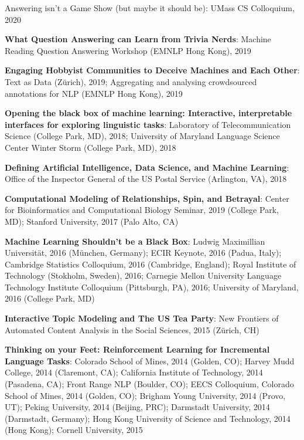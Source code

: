 {{\begin{enumerate*}
{      Answering isn't a Game Show (but maybe it should be)}: UMass CS
    Colloquium, 2020
\item {\bf What Question Answering can Learn from Trivia Nerds}:
  Machine Reading Question Answering Workshop (EMNLP Hong Kong), 2019
\item {\bf  Engaging Hobbyist
Communities to Deceive Machines and
Each Other}: Text as Data (Z\"urich), 2019; Aggregating and analysing
crowdsourced annotations for NLP (EMNLP Hong Kong), 2019
\item {\bf Opening the black box of machine learning: Interactive, interpretable interfaces for exploring linguistic tasks}: Laboratory of Telecommunication Science (College Park,
  MD), 2018;  University of Maryland Language Science Center Winter
  Storm (College Park, MD), 2018
\item {\bf Defining Artificial Intelligence, Data Science, and Machine
    Learning}: Office of the Inspector General of the US Postal
  Service (Arlington, VA), 2018
\item {\bf Computational Modeling of Relationships, Spin, and
    Betrayal}: Center for Bioinformatics and Computational Biology
  Seminar, 2019 (College Park, MD); Stanford University, 2017 (Palo
  Alto, CA)
\item {\bf Machine Learning Shouldn't be a Black Box}: Ludwig
  Maximillian Universit\"at, 2016 (M\"unchen, Germany); ECIR Keynote,
  2016 (Padua, Italy); Cambridge Statistics Colloquium, 2016
  (Cambridge, England); Royal Institute of Technology (Stokholm,
  Sweden), 2016; Carnegie Mellon University Language Technology
    Institute Colloquium (Pittsburgh, PA), 2016; University of
    Maryland, 2016 (College Park, MD)
	\item {\bf Interactive Topic Modeling and The US Tea Party}:
          New Frontiers of Automated Content Analysis in the Social
          Sciences, 2015 (Z\"urich, CH)
	\item {\bf Thinking on your Feet: Reinforcement Learning for Incremental
Language Tasks}: Colorado School of Mines, 2014 (Golden, CO); Harvey
Mudd College, 2014 (Claremont, CA); California Institute of
Technology, 2014 (Pasadena, CA); Front Range NLP (Boulder, CO); EECS
Colloquium, Colorado School of Mines, 2014 (Golden, CO); Brigham Young
University, 2014 (Provo, UT); Peking University, 2014 (Beijing, PRC);
Darmstadt University, 2014 (Darmstadt, Germany); Hong Kong University
of Science and Technology, 2014 (Hong Kong); Cornell University, 2015

\end{enumerate*}}}
